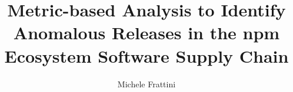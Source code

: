\documentclass{masterthesis}
\begin{document}
\title{Metric-based Analysis to Identify Anomalous Releases in the npm Ecosystem Software Supply Chain}

\author{Michele Frattini}



\maketitle

\begin{abstract}

\end{abstract}

\tableofcontents

\listoffigures
\listoftables





























\printbibliography
% 
% 
\end{document}

